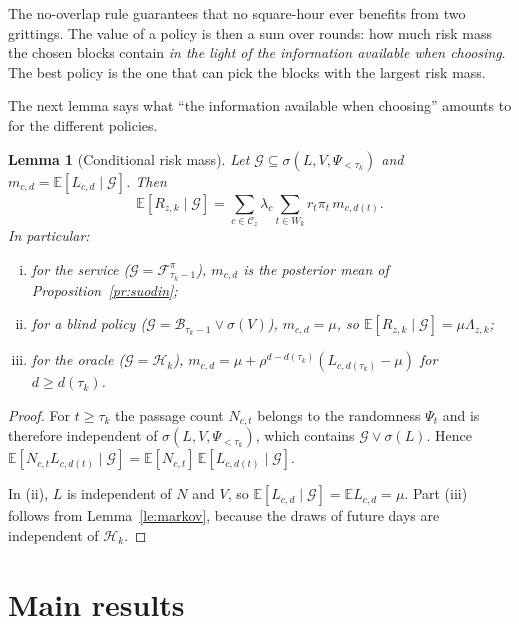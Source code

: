\documentclass[11pt,a4paper]{article}
\theoremstyle{plain}
\newtheorem{lemma}{Lemma}
\theoremstyle{definition}
\theoremstyle{remark}
\newcommand{\E}{\mathbb{E}}
\newcommand{\cC}{\mathcal{C}}
\newcommand{\cF}{\mathcal{F}}
\newcommand{\cB}{\mathcal{B}}
\newcommand{\cG}{\mathcal{G}}
\newcommand{\cH}{\mathcal{H}}
\newcommand{\1}{\mathbf{1}}
\begin{document}
\begin{intuitio}
The no-overlap rule guarantees that no square-hour ever benefits from two
grittings. The value of a policy is then a sum over rounds: how much risk mass
the chosen blocks contain \emph{in the light of the information available when
choosing}. The best policy is the one that can pick the blocks with the largest
risk mass.
\end{intuitio}

The next lemma says what ``the information available when choosing'' amounts to
for the different policies.

\begin{lemma}[Conditional risk mass]\label{le:ehdollinen}
Let $\cG \subseteq \sigma(L, V, \Psi_{<\tau_k})$ and $m_{c,d} = \E[L_{c,d} \mid \cG]$.
Then
\[
  \E[R_{z,k} \mid \cG] = \sum_{c \in \cC_z} \lambda_c \sum_{t \in W_k} r_t \pi_t\, m_{c,d(t)}.
\]
In particular:
\begin{enumerate}[(i)]
  \item for the service ($\cG = \cF^\pi_{\tau_k - 1}$), $m_{c,d}$ is the posterior
  mean of Proposition~\ref{pr:suodin};
  \item for a blind policy ($\cG = \cB_{\tau_k-1} \vee \sigma(V)$),
  $m_{c,d} = \mu$, so $\E[R_{z,k} \mid \cG] = \mu \Lambda_{z,k}$;
  \item for the oracle ($\cG = \cH_k$),
  $m_{c,d} = \mu + \rho^{d - d(\tau_k)}(L_{c,d(\tau_k)} - \mu)$ for $d \ge d(\tau_k)$.
\end{enumerate}
\end{lemma}

\begin{proof}
For $t \ge \tau_k$ the passage count $N_{c,t}$ belongs to the randomness $\Psi_t$
and is therefore independent of $\sigma(L, V, \Psi_{<\tau_k})$, which contains
$\cG \vee \sigma(L)$. Hence
$\E[N_{c,t} L_{c,d(t)} \mid \cG] = \E[N_{c,t}]\,\E[L_{c,d(t)} \mid \cG]$.

In (ii), $L$ is independent of $N$ and $V$, so
$\E[L_{c,d} \mid \cG] = \E L_{c,d} = \mu$. Part (iii) follows from
Lemma~\ref{le:markov}, because the draws of future days are independent of
$\cH_k$.
\end{proof}

\section{Main results}\label{sec:lauseet}
\end{document}
